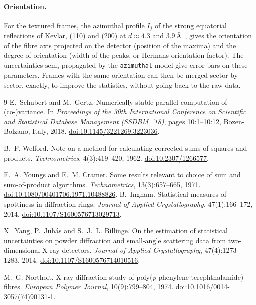 \documentclass[a4paper,11pt]{article}
\begin{document}
\paragraph{Orientation.} For the textured frames, the azimuthal profile $I_j$ of the strong equatorial
reflections of Kevlar, (110) and (200) at $d\approx4.3$ and $3.9$\,\AA~\cite{Northolt74}, gives the
orientation of the fibre axis projected on the detector (position of the maxima) and the degree of
orientation (width of the peaks, or Hermans orientation factor). The uncertainties $\mathrm{sem}_j$
propagated by the \texttt{azimuthal} model give error bars on these parameters. Frames with the same
orientation can then be merged sector by sector, exactly, to improve the statistics, without going back
to the raw data.

{\sloppy\begin{thebibliography}{9}
E.~Schubert and M.~Gertz.
\newblock Numerically stable parallel computation of (co-)variance.
\newblock In \emph{Proceedings of the 30th International Conference on Scientific and Statistical
  Database Management (SSDBM~'18)}, pages 10:1--10:12, Bozen-Bolzano, Italy, 2018.
\newblock \href{https://doi.org/10.1145/3221269.3223036}{doi:10.1145/3221269.3223036}.

B.~P. Welford.
\newblock Note on a method for calculating corrected sums of squares and products.
\newblock \emph{Technometrics}, 4(3):419--420, 1962.
\newblock \href{https://doi.org/10.2307/1266577}{doi:10.2307/1266577}.

E.~A. Youngs and E.~M. Cramer.
\newblock Some results relevant to choice of sum and sum-of-product algorithms.
\newblock \emph{Technometrics}, 13(3):657--665, 1971.
\newblock \href{https://doi.org/10.1080/00401706.1971.10488826}{doi:10.1080/00401706.1971.10488826}.
B.~Ingham.
\newblock Statistical measures of spottiness in diffraction rings.
\newblock \emph{Journal of Applied Crystallography}, 47(1):166--172, 2014.
\newblock \href{https://doi.org/10.1107/S1600576713029713}{doi:10.1107/S1600576713029713}.

X.~Yang, P.~Juh\'as and S.~J.~L. Billinge.
\newblock On the estimation of statistical uncertainties on powder diffraction and small-angle
  scattering data from two-dimensional X-ray detectors.
\newblock \emph{Journal of Applied Crystallography}, 47(4):1273--1283, 2014.
\newblock \href{https://doi.org/10.1107/S1600576714010516}{doi:10.1107/S1600576714010516}.

M.~G. Northolt.
\newblock X-ray diffraction study of poly(\emph{p}-phenylene terephthalamide) fibres.
\newblock \emph{European Polymer Journal}, 10(9):799--804, 1974.
\newblock \href{https://doi.org/10.1016/0014-3057(74)90131-1}{doi:10.1016/0014-3057(74)90131-1}.
\end{thebibliography}}
\end{document}
